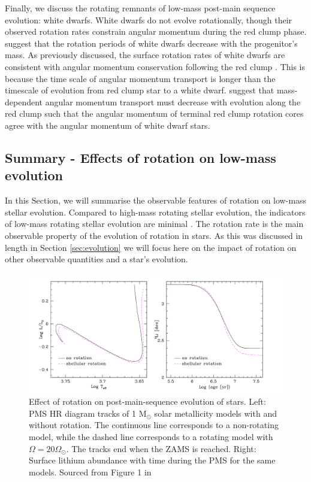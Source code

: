 Finally, we discuss the rotating remnants of low-mass post-main sequence evolution: white dwarfs.
White dwarfs do not evolve rotationally, though their observed rotation rates constrain angular momentum during the red clump phase.
\citet{hermes_white_2017} suggest that the rotation periods of white dwarfs decrease with the progenitor's mass.
As previously discussed, the surface rotation rates of white dwarfs are consistent with angular momentum conservation following the red clump \citep{den_hartogh_constraining_2019, cantiello_angular_2014}.
This is because the time scale of angular momentum transport is longer than the timescale of evolution from red clump star to a white dwarf.
\citet{den_hartogh_constraining_2019} suggest that mass-dependent angular momentum transport must decrease with evolution along the red clump such that the angular momentum of terminal red clump rotation cores agree with the angular momentum of white dwarf stars.

\subsection{Summary - Effects of rotation on low-mass evolution}

In this Section, we will summarise the observable features of rotation on low-mass stellar evolution.
Compared to high-mass rotating stellar evolution, the indicators of low-mass rotating stellar evolution are minimal \citep[see, e.g.,][]{heger_presupernova_2000, maeder_evolution_2000}.
The rotation rate is the main observable property of the evolution of rotation in stars.
As this was discussed in length in Section \ref{sec:evolution} we will focus here on the impact of rotation on other observable quantities and a star's evolution.

\begin{figure}[h]
    \includegraphics[width=\textwidth]{Figures/intro_figures/PMS_effect.png}
    \caption[Effect of rotation on pre-main-sequence evolution of a 1 $M_{\odot}$ star.]{Effect of rotation on post-main-sequence evolution of stars. Left: PMS HR diagram tracks of 1 M$_{\odot}$ solar metallicity models with and without rotation. The continuous line corresponds to a non-rotating model, while the dashed line corresponds to a rotating model with $\Omega = 20 \Omega_{\odot}$. The tracks end when the ZAMS is reached. Right: Surface lithium abundance with time during the PMS for the same models. Sourced from Figure 1 in \citet{eggenberger_rotation_2013}}
    \label{fig:pms_effect}
\end{figure}


